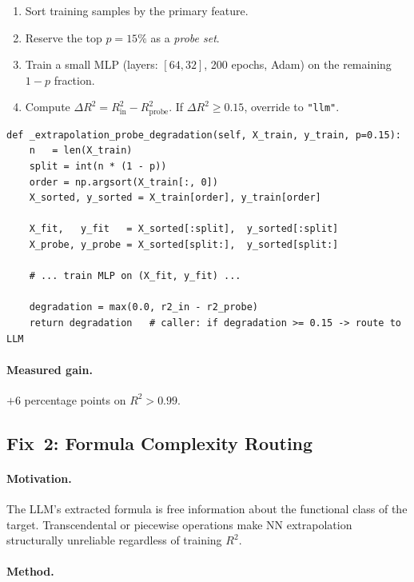 \documentclass[twoside,11pt]{article}
\begin{document}
\begin{enumerate}
  \item Sort training samples by the primary feature.
  \item Reserve the top $p = 15\%$ as a \emph{probe set}.
  \item Train a small MLP (layers: $[64, 32]$, 200 epochs, Adam) on the
        remaining $1-p$ fraction.
  \item Compute $\Delta R^2 = R^2_{\text{in}} - R^2_{\text{probe}}$.
        If $\Delta R^2 \geq 0.15$, override to \texttt{"llm"}.
\end{enumerate}

\begin{lstlisting}[caption={Extrapolation probe core logic.}]
def _extrapolation_probe_degradation(self, X_train, y_train, p=0.15):
    n   = len(X_train)
    split = int(n * (1 - p))
    order = np.argsort(X_train[:, 0])
    X_sorted, y_sorted = X_train[order], y_train[order]

    X_fit,   y_fit   = X_sorted[:split],  y_sorted[:split]
    X_probe, y_probe = X_sorted[split:],  y_sorted[split:]

    # ... train MLP on (X_fit, y_fit) ...

    degradation = max(0.0, r2_in - r2_probe)
    return degradation   # caller: if degradation >= 0.15 -> route to LLM
\end{lstlisting}

\paragraph{Measured gain.} $+6$ percentage points on $R^2 > 0.99$.

\subsection{Fix~2: Formula Complexity Routing}

\paragraph{Motivation.}
The LLM's extracted formula is free information about the functional class of
the target.  Transcendental or piecewise operations make NN extrapolation
structurally unreliable regardless of training $R^2$.

\paragraph{Method.}
\end{document}
